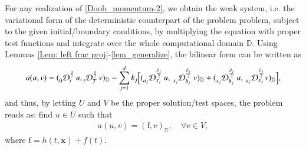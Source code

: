 For any realization of \eqref{Doob_momentum-2}, we obtain the weak system, i.e. the variational form of the deterministic counterpart of the problem problem, subject to the given initial/boundary conditions, by multiplying the equation with proper test functions and integrate over the whole computational domain $\mathbb{D}$. Using Lemmas \ref{Lem: left frac proj}-\ref{lem_generalize}, the bilinear form can be written as
%
\begin{align}
%
\label{Eq: bilinear form}
a(u,v)
=(\prescript{}{0}{\mathcal{D}}_{t}^{\frac{\alpha}{2}}\, u, \prescript{}{t}{\mathcal{D}}_{T}^{\frac{\alpha}{2}}\, v )_{\mathbb{D}} 
%
-\sum_{j=1}^{d} 
k_{j} \Big[ ( \prescript{}{a_j}{\mathcal{D}}_{x_j}^{\frac{\beta_j}{2}}\, u,\, \prescript{}{x_j}{\mathcal{D}}_{b_j}^{\frac{\beta_j}{2}}\, v )_{\mathbb{D}}
+ ( \prescript{}{x_j}{\mathcal{D}}_{b_j}^{\frac{\beta_j}{2}}\, u , \, \prescript{}{a_j}{\mathcal{D}}_{x_j}^{\frac{\beta_j}{2}} v)_{\mathbb{D}}
\Big] ,
%
\end{align}
%
and thus, by letting $U$ and $V$ be the proper solution/test spaces, the problem reads as: find $u \in U$ such that
%
\begin{align}
%
\label{Eq: general weak form FPDE}
a(u,v) = (\text{f},v)_{\mathbb{D}}, \quad \forall v \in V ,
%
\end{align}
%
where $\text{f} =  h(t,\textbf{x}) +  f(t) $.







%
%
